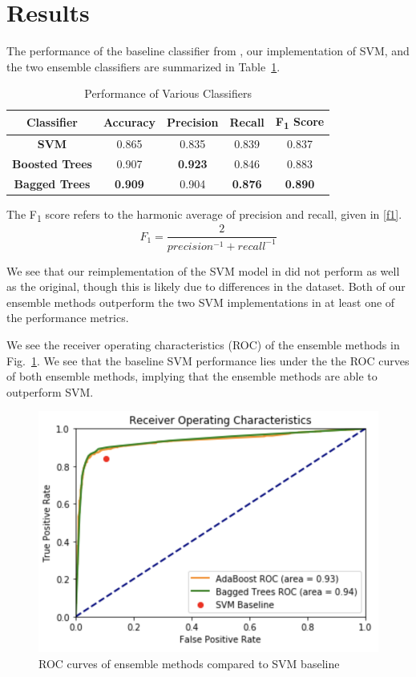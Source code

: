 \documentclass[conference]{IEEEtran}
\begin{document}
\section{Results}
The performance of the baseline classifier from \cite{Marafino}, our implementation of SVM, and the two ensemble classifiers are summarized in Table~\ref{restab}.
\begin{table}[htbp]
\caption{Performance of Various Classifiers}
\begin{center}
\begin{tabular}{ccccc}
\textbf{Classifier}&\textbf{Accuracy}&\textbf{Precision}&\textbf{Recall}&\textbf{F\textsubscript{1} Score} \\
\hline
\textbf{SVM} & 0.865 & 0.835 & 0.839 & 0.837 \\
\textbf{Boosted Trees} & 0.907 & \textbf{0.923} & 0.846 & 0.883 \\
\textbf{Bagged Trees} & \textbf{0.909} & 0.904 & \textbf{0.876} & \textbf{0.890} \\
\end{tabular}
\label{restab}
\end{center}
\end{table}
The F\textsubscript{1} score refers to the harmonic average of precision and recall, given in \eqref{f1}.
\begin{equation}
F_1 = \frac{2}{precision^{-1} + recall^{-1}}\label{f1}
\end{equation}

We see that our reimplementation of the SVM model in \cite{Marafino} did not perform as well as the original, though this is likely due to differences in the dataset. Both of our ensemble methods outperform the two SVM implementations in at least one of the performance metrics. 

We see the receiver operating characteristics (ROC) of the ensemble methods in Fig.~\ref{roc}. We see that the baseline SVM performance lies under the the ROC curves of both ensemble methods, implying that the ensemble methods are able to outperform SVM. 
\begin{figure}[htbp]
\centerline{\includegraphics[scale=0.6]{roc}}
\caption{ROC curves of ensemble methods compared to SVM baseline}
\label{roc}
\end{figure}
\end{document}
